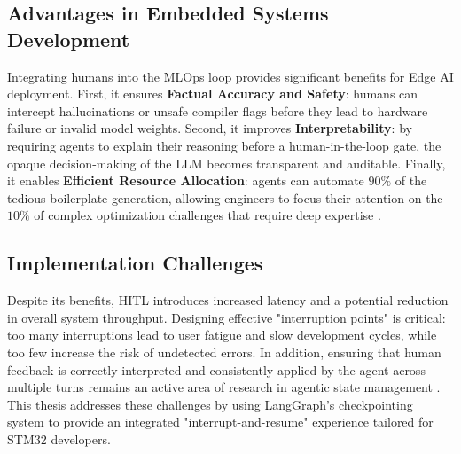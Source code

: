 \subsection{Advantages in Embedded Systems Development}
Integrating humans into the MLOps loop provides significant benefits for Edge AI deployment. First, it ensures \textbf{Factual Accuracy and Safety}: humans can intercept hallucinations or unsafe compiler flags before they lead to hardware failure or invalid model weights. Second, it improves \textbf{Interpretability}: by requiring agents to explain their reasoning before a human-in-the-loop gate, the opaque decision-making of the LLM becomes transparent and auditable. Finally, it enables \textbf{Efficient Resource Allocation}: agents can automate $90\%$ of the tedious boilerplate generation, allowing engineers to focus their attention on the $10\%$ of complex optimization challenges that require deep expertise \cite{zhang2025_clinical_iterative}.

\subsection{Implementation Challenges}
Despite its benefits, HITL introduces increased latency and a potential reduction in overall system throughput. Designing effective "interruption points" is critical: too many interruptions lead to user fatigue and slow development cycles, while too few increase the risk of undetected errors. In addition, ensuring that human feedback is correctly interpreted and consistently applied by the agent across multiple turns remains an active area of research in agentic state management \cite{llmhas2025survey}. This thesis addresses these challenges by using LangGraph's checkpointing system to provide an integrated "interrupt-and-resume" experience tailored for STM32 developers.
